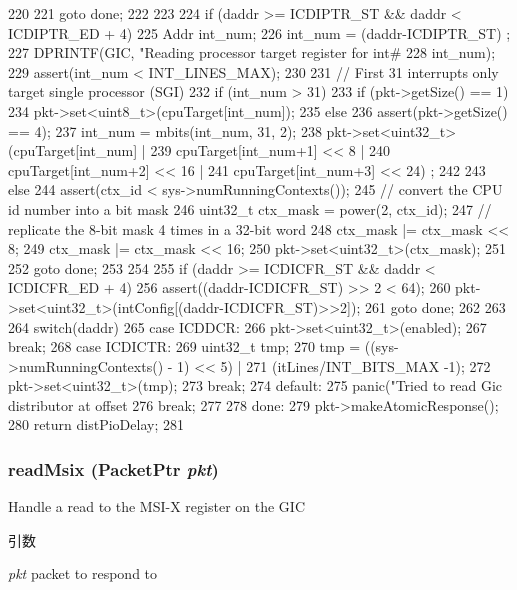 \begin{DoxyCode}
{{{220         }
221         goto done;
222     }
223 
224     if (daddr >= ICDIPTR_ST && daddr < ICDIPTR_ED + 4) {
225         Addr int_num;
226         int_num = (daddr-ICDIPTR_ST) ;
227         DPRINTF(GIC, "Reading processor target register for int# %
228                  int_num);
229         assert(int_num < INT_LINES_MAX);
230 
231         // First 31 interrupts only target single processor (SGI)
232         if (int_num > 31) {
233             if (pkt->getSize() == 1) {
234                 pkt->set<uint8_t>(cpuTarget[int_num]);
235             } else {
236                 assert(pkt->getSize() == 4);
237                 int_num = mbits(int_num, 31, 2);
238                 pkt->set<uint32_t>(cpuTarget[int_num] |
239                                    cpuTarget[int_num+1] << 8 |
240                                    cpuTarget[int_num+2] << 16 |
241                                    cpuTarget[int_num+3] << 24) ;
242             }
243         } else {
244             assert(ctx_id < sys->numRunningContexts());
245             // convert the CPU id number into a bit mask
246             uint32_t ctx_mask = power(2, ctx_id);
247             // replicate the 8-bit mask 4 times in a 32-bit word
248             ctx_mask |= ctx_mask << 8;
249             ctx_mask |= ctx_mask << 16;
250             pkt->set<uint32_t>(ctx_mask);
251         }
252         goto done;
253     }
254 
255     if (daddr >= ICDICFR_ST && daddr < ICDICFR_ED + 4) {
256         assert((daddr-ICDICFR_ST) >> 2 < 64);
260         pkt->set<uint32_t>(intConfig[(daddr-ICDICFR_ST)>>2]);
261         goto done;
262     }
263 
264     switch(daddr) {
265       case ICDDCR:
266         pkt->set<uint32_t>(enabled);
267         break;
268       case ICDICTR:
269         uint32_t tmp;
270         tmp = ((sys->numRunningContexts() - 1) << 5) |
271               (itLines/INT_BITS_MAX -1);
272         pkt->set<uint32_t>(tmp);
273         break;
274       default:
275         panic("Tried to read Gic distributor at offset %
276         break;
277     }
278 done:
279     pkt->makeAtomicResponse();
280     return distPioDelay;
281 }
\end{DoxyCode}
\hypertarget{classPl390_a1142f717b26e0ca228aa41f04a8c9b9c}{
\subsubsection[{readMsix}]{ readMsix ({\bf PacketPtr} {\em pkt})}}
\label{classPl390_a1142f717b26e0ca228aa41f04a8c9b9c}
Handle a read to the MSI-\/X register on the GIC 
\begin{DoxyParams}{引数}
\item[{\em pkt}]packet to respond to \end{DoxyParams}



